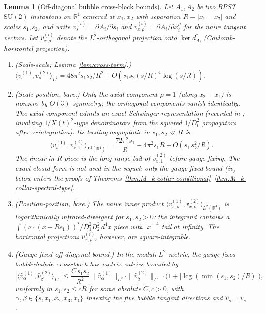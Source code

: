 \documentclass[11pt,letterpaper]{article}
\newtheorem{lemma}[theorem]{Lemma}
\theoremstyle{definition}
\newcommand{\bbR}{\mathbb{R}}
\begin{document}
\begin{lemma}[Off-diagonal bubble cross-block bounds]\label{lem:OD}
Let $A_1, A_2$ be two BPST $\mathrm{SU}(2)$ instantons on $\bbR^4$ centered at $x_1, x_2$ with separation $R = |x_1 - x_2|$ and scales $s_1, s_2$, and write $v_s^{(i)} = \partial A_i/\partial s_i$ and $v_{x,\rho}^{(i)} = \partial A_i/\partial x_i^\rho$ for the naive tangent vectors. Let $\hat{v}_{x,\rho}^{(i)}$ denote the $L^2$-orthogonal projection onto $\ker d_{A_i}^*$ (Coulomb-horizontal projection).
\begin{enumerate}
\item[(i)] \emph{(Scale-scale; Lemma~\ref{lem:cross-term}.)} $\langle v_s^{(1)}, v_s^{(2)}\rangle_{L^2} = 48\pi^2 s_1 s_2/R^2 + O(s_1 s_2 (s/R)^4 \log(s/R))$.
\item[(ii)] \emph{(Scale-position, bare.)} Only the axial component $\rho=1$ (along $x_2-x_1$) is nonzero by $O(3)$-symmetry; the orthogonal components vanish identically. The axial component admits an exact Schwinger representation (recorded in \cite{lemma-od-script}; involving $1/X(t)^2$-type denominators from the squared $1/D_i^2$ propagators after $\sigma$-integration). Its leading asymptotic in $s_1, s_2 \ll R$ is
\begin{equation}\label{eq:OD-bare-sx-asymp}
\langle v_s^{(1)}, v_{x,1}^{(2)}\rangle_{L^2(\bbR^4)} = \frac{72\pi^2 s_1}{R} - 4\pi^2 s_1 R + O(s_1\,s_2^2/R).
\end{equation}
The linear-in-$R$ piece is the long-range tail of $v_{x,1}^{(2)}$ before gauge fixing. The exact closed form is not used in the sequel; only the gauge-fixed bound (iv) below enters the proofs of Theorems~\ref{thm:M_k-collar-conditional}--\ref{thm:M_k-collar-spectral-type}.
\item[(iii)] \emph{(Position-position, bare.)} The naive inner product $\langle v_{x,\rho}^{(1)}, v_{x,\sigma}^{(2)}\rangle_{L^2(\bbR^4)}$ is logarithmically infrared-divergent for $s_1, s_2 > 0$: the integrand contains a $\int (x\cdot(x-Re_1))^2/D_1^2 D_2^2\,d^4x$ piece with $|x|^{-4}$ tail at infinity. The horizontal projections $\hat{v}_{x,\rho}^{(i)}$, however, are square-integrable.
\item[(iv)] \emph{(Gauge-fixed off-diagonal bound.)} In the moduli $L^2$-metric, the gauge-fixed bubble-bubble cross-block has matrix entries bounded by
\begin{equation}\label{eq:OD-horiz}
|\langle \hat{v}_\alpha^{(1)}, \hat{v}_\beta^{(2)}\rangle_{L^2}| \le \frac{C\, s_1 s_2}{R^2}\,\|\hat{v}_\alpha^{(1)}\|_{L^2}\cdot\|\hat{v}_\beta^{(2)}\|_{L^2}\cdot\bigl(1 + |\log(\min(s_1,s_2)/R)|\bigr),
\end{equation}
uniformly in $s_1, s_2 \le c R$ for some absolute $C, c > 0$, with $\alpha, \beta \in \{s, x_1, x_2, x_3, x_4\}$ indexing the five bubble tangent directions and $\hat{v}_s = v_s$.


\end{enumerate}
\end{lemma}
\end{document}
